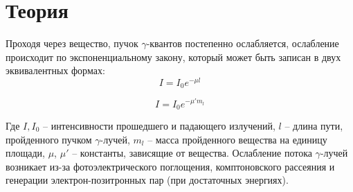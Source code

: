 

\newcommand{\formula}[2]
{
    \begin{equation}\label{#1}
        #2
    \end{equation}
}

\newcommand{\mth}[1]
{
    \begin{math}
        #1
    \end{math}
}

\newcommand{\ruB}[1]
{
    _{\text{#1}}
}

\setcounter{PicsCounter}{1}

\newcommand{\pic}[3]{
    \begin{center}
        \begin{minipage}[h!]{#1}
            \begin{center}

                \texttt{[image: \#2]}
                \textit{Рис \arabic{PicsCounter}. #3}

            \end{center}
        \end{minipage}
    \end{center}

    \stepcounter{PicsCounter}
}

\setcounter{TablesCounter}{1}

\newcommand{\tableLable}[1]{
    \textit{Таблица \arabic{TablesCounter}: #1}

    \stepcounter{TablesCounter}
}

\section{Теория}

Проходя через вещество, пучок $ \gamma $-квантов постепенно ослабляется, ослабление
происходит по экспоненциальному закону, который может быть записан в двух эквивалентных
формах: \\

\formula{eq::I_first}{
    I = I_0 e^{-\mu l}
}

\formula{eq::I_second}{
    I = I_0 e^{-\mu' m_l}
}

Где $ I, I_0 $ -- интенсивности прошедшего и падающего излучений, $ l $ -- длина пути,
пройденного пучком $ \gamma $-лучей, $ m_l $ -- масса пройденного вещества на единицу
площади, $ \mu $, $ \mu' $ -- константы, зависящие от вещества. Ослабление потока
$ \gamma $-лучей возникает из-за фотоэлектрического поглощения, комптоновского рассеяния и
генерации электрон-позитронных пар (при достаточных энергиях).\\

